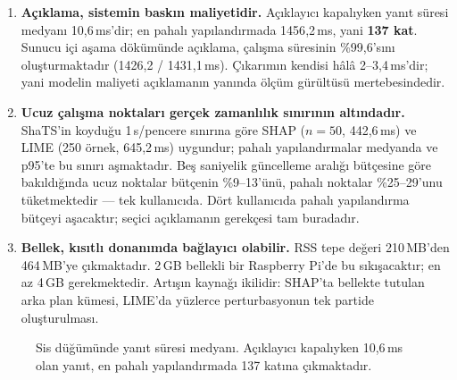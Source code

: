 \documentclass[conference]{IEEEtran}
\newcommand{\ms}{\,ms\xspace}
\begin{document}
\begin{enumerate}
\item \textbf{Açıklama, sistemin baskın maliyetidir.} Açıklayıcı kapalıyken
yanıt süresi medyanı 10{,}6\ms'dir; en pahalı yapılandırmada 1456{,}2\ms,
yani \textbf{137 kat}. Sunucu içi aşama dökümünde açıklama, çalışma süresinin
\%99{,}6'sını oluşturmaktadır (1426{,}2 / 1431{,}1\ms). Çıkarımın kendisi hâlâ
2--3{,}4\ms'dir; yani modelin maliyeti açıklamanın yanında ölçüm gürültüsü
mertebesindedir.

\item \textbf{Ucuz çalışma noktaları gerçek zamanlılık sınırının altındadır.}
ShaTS'in \cite{shats2025} koyduğu 1\,s/pencere sınırına göre SHAP ($n{=}50$,
442{,}6\ms) ve LIME (250 örnek, 645{,}2\ms) uygundur; pahalı yapılandırmalar
medyanda ve p95'te bu sınırı aşmaktadır. Beş saniyelik güncelleme aralığı
bütçesine göre bakıldığında ucuz noktalar bütçenin \%9--13'ünü, pahalı noktalar
\%25--29'unu tüketmektedir --- tek kullanıcıda. Dört kullanıcıda pahalı
yapılandırma bütçeyi aşacaktır; seçici açıklamanın gerekçesi tam buradadır.

\item \textbf{Bellek, kısıtlı donanımda bağlayıcı olabilir.} RSS tepe değeri
210\,MB'den 464\,MB'ye çıkmaktadır. 2\,GB bellekli bir Raspberry Pi'de bu
sıkışacaktır; en az 4\,GB gerekmektedir. Artışın kaynağı ikilidir: SHAP'ta
bellekte tutulan arka plan kümesi, LIME'da yüzlerce perturbasyonun tek partide
oluşturulması.
\end{enumerate}

\begin{figure}[t]
\centering
{}
\caption{Sis düğümünde yanıt süresi medyanı. Açıklayıcı kapalıyken 10{,}6\ms
olan yanıt, en pahalı yapılandırmada 137 katına çıkmaktadır.}
\label{fig:fogbar}
\end{figure}
\end{document}
